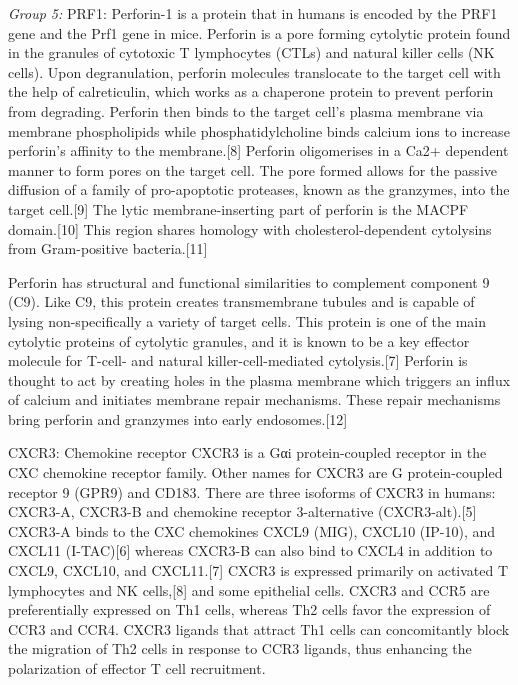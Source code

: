 \documentclass[
]{article}
\begin{document}
\emph{Group 5:} PRF1: Perforin-1 is a protein that in humans is encoded
by the PRF1 gene and the Prf1 gene in mice. Perforin is a pore forming
cytolytic protein found in the granules of cytotoxic T lymphocytes
(CTLs) and natural killer cells (NK cells). Upon degranulation, perforin
molecules translocate to the target cell with the help of calreticulin,
which works as a chaperone protein to prevent perforin from degrading.
Perforin then binds to the target cell's plasma membrane via membrane
phospholipids while phosphatidylcholine binds calcium ions to increase
perforin's affinity to the membrane.{[}8{]} Perforin oligomerises in a
Ca2+ dependent manner to form pores on the target cell. The pore formed
allows for the passive diffusion of a family of pro-apoptotic proteases,
known as the granzymes, into the target cell.{[}9{]} The lytic
membrane-inserting part of perforin is the MACPF domain.{[}10{]} This
region shares homology with cholesterol-dependent cytolysins from
Gram-positive bacteria.{[}11{]}

Perforin has structural and functional similarities to complement
component 9 (C9). Like C9, this protein creates transmembrane tubules
and is capable of lysing non-specifically a variety of target cells.
This protein is one of the main cytolytic proteins of cytolytic
granules, and it is known to be a key effector molecule for T-cell- and
natural killer-cell-mediated cytolysis.{[}7{]} Perforin is thought to
act by creating holes in the plasma membrane which triggers an influx of
calcium and initiates membrane repair mechanisms. These repair
mechanisms bring perforin and granzymes into early endosomes.{[}12{]}

CXCR3: Chemokine receptor CXCR3 is a Gαi protein-coupled receptor in the
CXC chemokine receptor family. Other names for CXCR3 are G
protein-coupled receptor 9 (GPR9) and CD183. There are three isoforms of
CXCR3 in humans: CXCR3-A, CXCR3-B and chemokine receptor 3-alternative
(CXCR3-alt).{[}5{]} CXCR3-A binds to the CXC chemokines CXCL9 (MIG),
CXCL10 (IP-10), and CXCL11 (I-TAC){[}6{]} whereas CXCR3-B can also bind
to CXCL4 in addition to CXCL9, CXCL10, and CXCL11.{[}7{]} CXCR3 is
expressed primarily on activated T lymphocytes and NK cells,{[}8{]} and
some epithelial cells. CXCR3 and CCR5 are preferentially expressed on
Th1 cells, whereas Th2 cells favor the expression of CCR3 and CCR4.
CXCR3 ligands that attract Th1 cells can concomitantly block the
migration of Th2 cells in response to CCR3 ligands, thus enhancing the
polarization of effector T cell recruitment.
\end{document}
